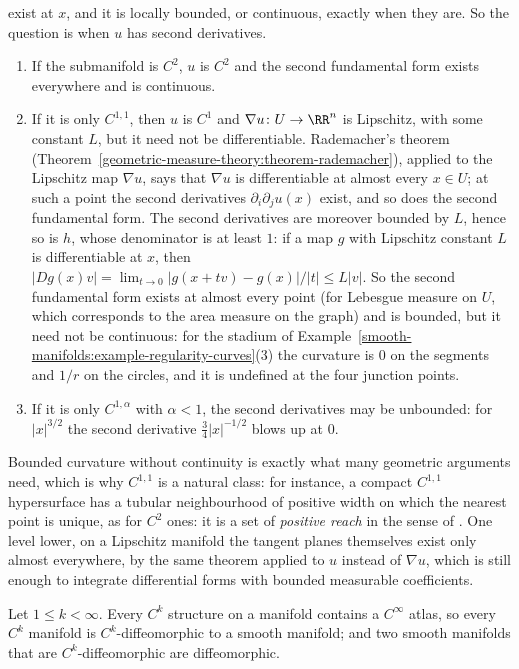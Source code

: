 \begin{remark}
exist at $x$, and it is locally bounded, or continuous, exactly when they are. So the question is when $u$ has second derivatives.
\begin{enumerate}
\item If the submanifold is $C^2$, $u$ is $C^2$ and the second fundamental form exists everywhere and is continuous.
\item If it is only $C^{1,1}$, then $u$ is $C^1$ and $\nabla u \colon U \to \RR^n$ is Lipschitz, with some constant $L$, but it need not be differentiable. Rademacher's theorem
(Theorem~\ref{geometric-measure-theory:theorem-rademacher}), applied to the Lipschitz map $\nabla u$, says that $\nabla u$ is differentiable at almost every $x \in U$; at such a point the second derivatives
$\partial_i\partial_ju(x)$ exist, and so does the second fundamental form. The second derivatives are moreover bounded by $L$, hence so is $h$, whose denominator is at least $1$: if a map $g$ with Lipschitz constant $L$ is differentiable at $x$, then
$|Dg(x)v| = \lim_{t \to 0}|g(x + tv) - g(x)|/|t| \leq L|v|$. So the second fundamental form exists at almost every point (for Lebesgue measure on $U$, which corresponds to the area measure on the graph) and is bounded,
but it need not be continuous: for the stadium of Example~\ref{smooth-manifolds:example-regularity-curves}(3) the curvature is $0$ on the segments and $1/r$ on the circles, and it is undefined at the four junction points.
\item If it is only $C^{1,\alpha}$ with $\alpha < 1$, the second derivatives may be unbounded: for $|x|^{3/2}$ the second derivative $\frac34|x|^{-1/2}$ blows up at $0$.
\end{enumerate}
Bounded curvature without continuity is exactly what many geometric arguments need, which is why $C^{1,1}$ is a natural class: for instance, a compact $C^{1,1}$ hypersurface has a tubular neighbourhood of positive width
on which the nearest point is unique, as for $C^2$ ones: it is a set of \emph{positive reach} in the sense of \cite{federer-1959}. One level lower, on a Lipschitz manifold the tangent planes themselves exist only almost everywhere, by the same theorem applied to $u$ instead of $\nabla u$,
which is still enough to integrate differential forms with bounded measurable coefficients.
\end{remark}

\begin{theorem}[Whitney]\label{smooth-manifolds:theorem-whitney-smoothing}
Let $1 \leq k < \infty$. Every $C^k$ structure on a manifold contains a $C^\infty$ atlas, so every $C^k$ manifold is $C^k$-diffeomorphic to a smooth manifold; and two smooth manifolds that are $C^k$-diffeomorphic
are diffeomorphic.
\end{theorem}

